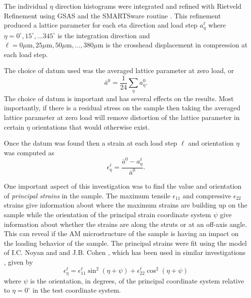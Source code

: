 The individual $\eta$ direction histograms were integrated and refined with Rietveld Refinement using GSAS \cite{GSAS} and the SMARTSware routine \cite{Smartsware2004}. This refinement produced a lattice parameter for each eta direction and load step $a_{\eta}^{\ell}$ where $\eta = 0^\circ, 15^\circ,...345^\circ$ is the integration direction and $\ell = 0 \mu\text{m}, 25\mu\text{m}, 50 \mu\text{m}, ... , 380 \mu\text{m}$ is the crosshead displacement in compression at each load step.

The choice of datum used was the averaged lattice parameter at zero load, or
\begin{equation}
	\bar a^0 = \frac{1}{24}\sum_\eta a_{\eta}^{0}.
	\label{datum}
\end{equation}
The choice of datum is important and has several effects on the results. Most importantly, if there is a residual stress on the sample then taking the averaged lattice parameter at zero load will remove distortion of the lattice parameter in certain $\eta$ orientations that would otherwise exist. 

Once the datum was found then a strain at each load step $\ell$ and orientation $\eta$ was computed as
\begin{equation}
	\epsilon_\eta^\ell = \frac{\bar a^0 - a_\eta^\ell}{\bar a^0}.
	\label{strain}
\end{equation}

One important aspect of this investigation was to find the value and orientation of \textit{principal strains} in the sample. The maximum tensile $\epsilon_{11}$ and compressive $\epsilon_{22}$ strains give information about where the maximum strains are building up on the sample while the orientation of the principal strain coordinate system $\psi$ give information about whether the strains are along the struts or at an off-axis angle. This can reveal if the AM microstructure of the sample is having an impact on the loading behavior of the sample. The principal strains were fit using the model of I.C. Noyan and and J.B. Cohen \cite{Noyan1987}, which has been used in similar investigations \cite{Brown2019}, given by
\begin{equation}
	\epsilon_{\eta}^{\ell} = \epsilon_{11}^{\ell}\sin^2{\left( \eta + \psi\right)} + \epsilon_{22}^{\ell}\cos^2{\left(\eta+\psi\right)}
	\label{strainmodel}
\end{equation}
where $\psi$ is the orientation, in degrees, of the principal coordinate system relative to $\eta = 0^\circ$ in the test coordinate system.

